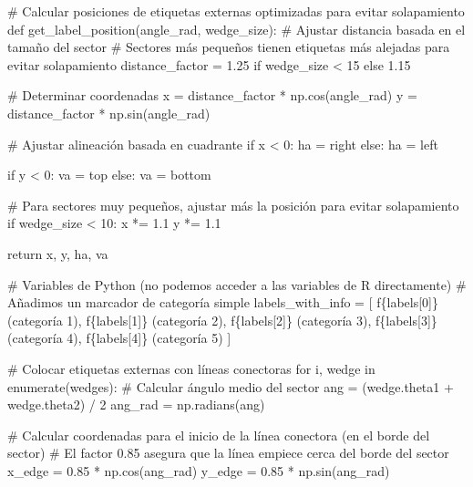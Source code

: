 \documentclass[
]{article}
\newenvironment{Shaded}{\begin{snugshade}}{\end{snugshade}}
\newcommand{\StringTok}[1]{\textcolor[rgb]{0.31,0.60,0.02}{#1}}
\begin{document}
\begin{Shaded}
\begin{Highlighting}[]
\StringTok{\# Calcular posiciones de etiquetas externas optimizadas para evitar solapamiento}
\StringTok{def get\_label\_position(angle\_rad, wedge\_size):}
\StringTok{    \# Ajustar distancia basada en el tamaño del sector}
\StringTok{    \# Sectores más pequeños tienen etiquetas más alejadas para evitar solapamiento}
\StringTok{    distance\_factor = 1.25 if wedge\_size \textless{} 15 else 1.15}

\StringTok{    \# Determinar coordenadas}
\StringTok{    x = distance\_factor * np.cos(angle\_rad)}
\StringTok{    y = distance\_factor * np.sin(angle\_rad)}

\StringTok{    \# Ajustar alineación basada en cuadrante}
\StringTok{    if x \textless{} 0:}
\StringTok{        ha = \textquotesingle{}right\textquotesingle{}}
\StringTok{    else:}
\StringTok{        ha = \textquotesingle{}left\textquotesingle{}}

\StringTok{    if y \textless{} 0:}
\StringTok{        va = \textquotesingle{}top\textquotesingle{}}
\StringTok{    else:}
\StringTok{        va = \textquotesingle{}bottom\textquotesingle{}}

\StringTok{    \# Para sectores muy pequeños, ajustar más la posición para evitar solapamiento}
\StringTok{    if wedge\_size \textless{} 10:}
\StringTok{        x *= 1.1}
\StringTok{        y *= 1.1}

\StringTok{    return x, y, ha, va}

\StringTok{\# Variables de Python (no podemos acceder a las variables de R directamente)}
\StringTok{\# Añadimos un marcador de categoría simple}
\StringTok{labels\_with\_info = [}
\StringTok{    f\textquotesingle{}\{labels[0]\} (categoría 1)\textquotesingle{},}
\StringTok{    f\textquotesingle{}\{labels[1]\} (categoría 2)\textquotesingle{},}
\StringTok{    f\textquotesingle{}\{labels[2]\} (categoría 3)\textquotesingle{},}
\StringTok{    f\textquotesingle{}\{labels[3]\} (categoría 4)\textquotesingle{},}
\StringTok{    f\textquotesingle{}\{labels[4]\} (categoría 5)\textquotesingle{}}
\StringTok{]}

\StringTok{\# Colocar etiquetas externas con líneas conectoras}
\StringTok{for i, wedge in enumerate(wedges):}
\StringTok{    \# Calcular ángulo medio del sector}
\StringTok{    ang = (wedge.theta1 + wedge.theta2) / 2}
\StringTok{    ang\_rad = np.radians(ang)}

\StringTok{    \# Calcular coordenadas para el inicio de la línea conectora (en el borde del sector)}
\StringTok{    \# El factor 0.85 asegura que la línea empiece cerca del borde del sector}
\StringTok{    x\_edge = 0.85 * np.cos(ang\_rad)}
\StringTok{    y\_edge = 0.85 * np.sin(ang\_rad)}


\end{Highlighting}
\end{Shaded}
\end{document}
